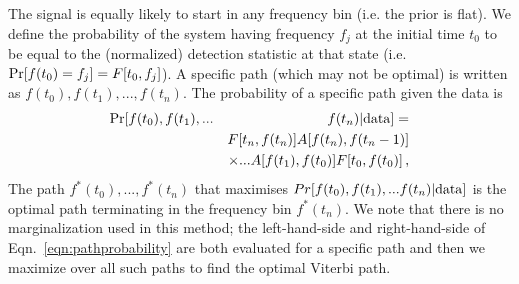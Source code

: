 \documentclass[paper-main.tex]{subfiles}
\begin{document}
The signal is equally likely to start in any frequency bin (i.e. the prior is flat). 
We define the probability of the system having frequency $f_j$ at the initial time $t_0$ to be equal to the (normalized) detection statistic at that state (i.e.\  ${\rm Pr}[f(t_0) = f_j] = F[t_0,f_j]$).
A specific path (which may not be optimal) is written as $f(t_0), f(t_1),..., f(t_n)$. 
The probability of a specific path given the data is 
\begin{eqnarray}
{\rm Pr}[ f(t_0), f(t_1),... && f(t_n) | {\rm data}] = \nonumber\\
          && F[t_n,f(t_n)] A[f(t_n),f(t_n-1)] \nonumber \\
          && \times... A[f(t_1),f(t_0)] F[t_0,f(t_0)] \,,
\label{eqn:pathprobability}
\end{eqnarray}
The path $f^\ast(t_0),...,f^\ast(t_n)$ that maximises $Pr[ f(t_0), f(t_1),... f(t_n) | {\rm data}]$ is the optimal path terminating in the frequency bin $f^\ast(t_n)$. 
We note that there is no marginalization used in this method; the left-hand-side and right-hand-side of Eqn.~\ref{eqn:pathprobability} are both evaluated for a specific path and then we maximize over all such paths to find the optimal Viterbi path. 
\end{document}
